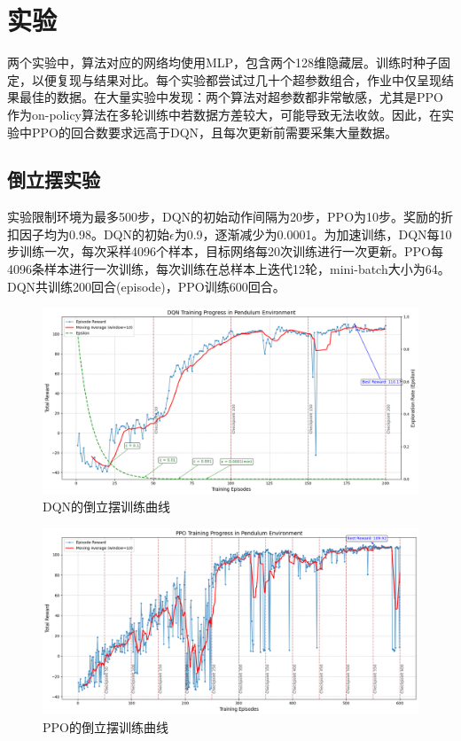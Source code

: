 \documentclass[12pt,a4paper]{article}
\begin{document}
\section{实验}
\label{sec:experienment}
两个实验中，算法对应的网络均使用MLP，包含两个128维隐藏层。训练时种子固定，以便复现与结果对比。每个实验都尝试过几十个超参数组合，作业中仅呈现结果最佳的数据。在大量实验中发现：两个算法对超参数都非常敏感，尤其是PPO作为on-policy算法在多轮训练中若数据方差较大，可能导致无法收敛。因此，在实验中PPO的回合数要求远高于DQN，且每次更新前需要采集大量数据。

\subsection{倒立摆实验}

实验限制环境为最多500步，DQN的初始动作间隔为20步，PPO为10步。奖励的折扣因子均为0.98。DQN的初始$\epsilon$为0.9，逐渐减少为0.0001。为加速训练，DQN每10步训练一次，每次采样4096个样本，目标网络每20次训练进行一次更新。PPO每4096条样本进行一次训练，每次训练在总样本上迭代12轮，mini-batch大小为64。DQN共训练200回合(episode)，PPO训练600回合。

\begin{figure}[htbp!]
    \centering
    \includegraphics[width=1\textwidth]{images/pendulum_dqn_train.png}
    \caption{DQN的倒立摆训练曲线}
    \label{fig:pendulum_dqn_train}
\end{figure}
\begin{figure}[htbp!]
    \centering
    \includegraphics[width=1\textwidth]{images/pendulum_ppo_train.png}
    \caption{PPO的倒立摆训练曲线}
    \label{fig:pendulum_ppo_train}
\end{figure}
\end{document}
